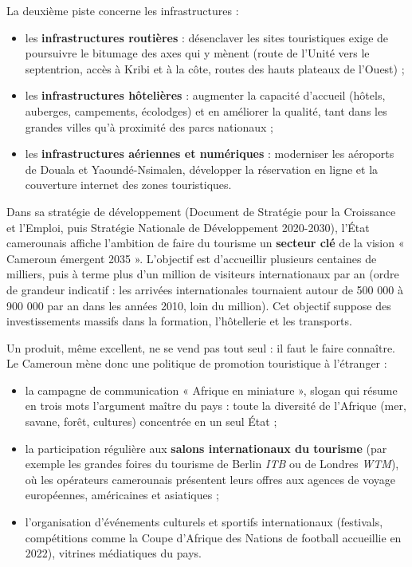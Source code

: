 \documentclass[11pt]{article}
\newcommand{\cle}[1]{{\popxbold\color{popdark}#1}}
\newcounter{popsec}
\newcounter{popsub}
\newcommand{\courssub}[1]{%
  \stepcounter{popsub}%
  \par\vspace{9pt}\noindent{\popxbold\fontsize{11.5}{13}\selectfont\color{popink}{\color{poporange}\thepopsec.\thepopsub}\hspace{6pt}#1}\par\nopagebreak\vspace{4pt}
}
\begin{document}
La deuxième piste concerne les \cle{infrastructures} :
\begin{itemize}
\item les \textbf{infrastructures routières} : désenclaver les sites touristiques exige de poursuivre le bitumage des axes qui y mènent (route de l'Unité vers le septentrion, accès à Kribi et à la côte, routes des hauts plateaux de l'Ouest) ;
\item les \textbf{infrastructures hôtelières} : augmenter la capacité d'accueil (hôtels, auberges, campements, écolodges) et en améliorer la qualité, tant dans les grandes villes qu'à proximité des parcs nationaux ;
\item les \textbf{infrastructures aériennes et numériques} : moderniser les aéroports de Douala et Yaoundé-Nsimalen, développer la réservation en ligne et la couverture internet des zones touristiques.
\end{itemize}

\begin{exemplebox}
Dans sa stratégie de développement (Document de Stratégie pour la Croissance et l'Emploi, puis Stratégie Nationale de Développement 2020-2030), l'État camerounais affiche l'ambition de faire du tourisme un \textbf{secteur clé} de la vision « \cle{Cameroun émergent 2035} ». L'objectif est d'accueillir plusieurs centaines de milliers, puis à terme plus d'un million de visiteurs internationaux par an (ordre de grandeur indicatif : les arrivées internationales tournaient autour de 500 000 à 900 000 par an dans les années 2010, loin du million). Cet objectif suppose des investissements massifs dans la formation, l'hôtellerie et les transports.
\end{exemplebox}

\courssub{Promouvoir le pays à l'étranger}

Un produit, même excellent, ne se vend pas tout seul : il faut le faire connaître. Le Cameroun mène donc une politique de \cle{promotion touristique} à l'étranger :
\begin{itemize}
\item la campagne de communication « \cle{Afrique en miniature} », slogan qui résume en trois mots l'argument maître du pays : toute la diversité de l'Afrique (mer, savane, forêt, cultures) concentrée en un seul État ;
\item la participation régulière aux \textbf{salons internationaux du tourisme} (par exemple les grandes foires du tourisme de Berlin \emph{ITB} ou de Londres \emph{WTM}), où les opérateurs camerounais présentent leurs offres aux agences de voyage européennes, américaines et asiatiques ;
\item l'organisation d'événements culturels et sportifs internationaux (festivals, compétitions comme la Coupe d'Afrique des Nations de football accueillie en 2022), vitrines médiatiques du pays.
\end{itemize}
\end{document}
